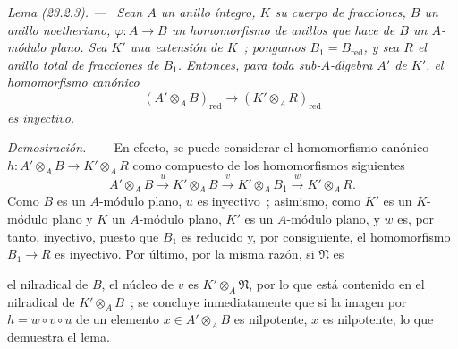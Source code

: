 \documentclass[10pt,oneside]{book}
\makeatletter
\newcommand{\setmanualcurrentlabel}[1]{\def\@currentlabel{#1}}
\newcommand{\oldpage}[2][]{%
  \setcounter{footnote}{0}%
  \marginpar{\scriptsize\textbf{#1}~|~#2}\ignorespaces}
\newenvironment{lemma}[1][]{%
  \setmanualcurrentlabel{#1}\par\medskip\noindent\itshape Lema (#1). ---\ }{\par}
\newenvironment{proof}{%
  \par\medskip\noindent\textit{Demostración. ---\ }}{\par}
\makeatother
\begin{document}
\begin{lemma}[23.2.3]
\label{0.23.2.3-es}
Sean $A$ un anillo íntegro, $K$ su cuerpo de fracciones, $B$ un anillo
noetheriano, $\varphi:A\to B$ un homomorfismo de anillos que hace de $B$ un
$A$-módulo plano. Sea $K'$ una extensión de $K$~; pongamos
$B_1=B_{\mathrm{red}}$, y sea $R$ el anillo total de fracciones de $B_1$.
Entonces, para toda sub-$A$-álgebra $A'$ de $K'$, el homomorfismo canónico
\begin{equation}
\label{0.23.1.8.1-es}
  (A'\otimes_AB)_{\mathrm{red}}
  \longrightarrow(K'\otimes_AR)_{\mathrm{red}}
  \tag{23.1.8.1}
\end{equation}
es inyectivo.
\end{lemma}

\begin{proof}
En efecto, se puede considerar el homomorfismo canónico
$h:A'\otimes_AB\to K'\otimes_AR$ como compuesto de los homomorfismos siguientes
\[
  A'\otimes_AB\xrightarrow{u}K'\otimes_AB
  \xrightarrow{v}K'\otimes_AB_1\xrightarrow{w}K'\otimes_AR.
\]
Como $B$ es un $A$-módulo plano, $u$ es inyectivo~; asimismo, como $K'$ es un
$K$-módulo plano y $K$ un $A$-módulo plano, $K'$ es un $A$-módulo plano, y
$w$ es, por tanto, inyectivo, puesto que $B_1$ es reducido y, por consiguiente, el homomorfismo
$B_1\to R$ es inyectivo. Por último, por la misma razón, si $\mathfrak N$ es

\oldpage[0\textsubscript{IV-1}]{218}

el nilradical de $B$, el núcleo de $v$ es $K'\otimes_A\mathfrak N$, por lo que está
contenido en el nilradical de $K'\otimes_AB$~; se concluye inmediatamente que si
la imagen por $h=w\circ v\circ u$ de un elemento $x\in A'\otimes_AB$ es
nilpotente, $x$ es nilpotente, lo que demuestra el lema.
\end{proof}
\end{document}
